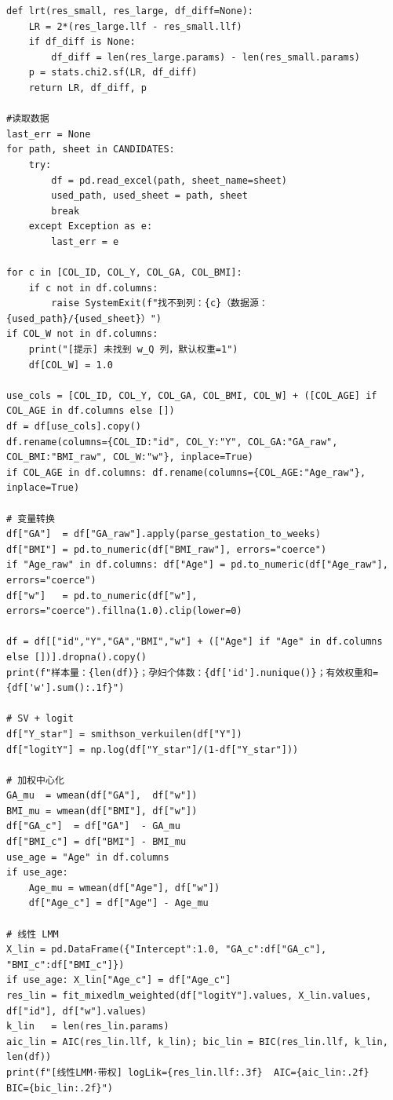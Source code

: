 \begin{lstlisting}
def lrt(res_small, res_large, df_diff=None):
    LR = 2*(res_large.llf - res_small.llf)
    if df_diff is None:
        df_diff = len(res_large.params) - len(res_small.params)
    p = stats.chi2.sf(LR, df_diff)
    return LR, df_diff, p

#读取数据
last_err = None
for path, sheet in CANDIDATES:
    try:
        df = pd.read_excel(path, sheet_name=sheet)
        used_path, used_sheet = path, sheet
        break
    except Exception as e:
        last_err = e

for c in [COL_ID, COL_Y, COL_GA, COL_BMI]:
    if c not in df.columns:
        raise SystemExit(f"找不到列：{c}（数据源：{used_path}/{used_sheet}）")
if COL_W not in df.columns:
    print("[提示] 未找到 w_Q 列，默认权重=1")
    df[COL_W] = 1.0

use_cols = [COL_ID, COL_Y, COL_GA, COL_BMI, COL_W] + ([COL_AGE] if COL_AGE in df.columns else [])
df = df[use_cols].copy()
df.rename(columns={COL_ID:"id", COL_Y:"Y", COL_GA:"GA_raw", COL_BMI:"BMI_raw", COL_W:"w"}, inplace=True)
if COL_AGE in df.columns: df.rename(columns={COL_AGE:"Age_raw"}, inplace=True)

# 变量转换
df["GA"]  = df["GA_raw"].apply(parse_gestation_to_weeks)
df["BMI"] = pd.to_numeric(df["BMI_raw"], errors="coerce")
if "Age_raw" in df.columns: df["Age"] = pd.to_numeric(df["Age_raw"], errors="coerce")
df["w"]   = pd.to_numeric(df["w"], errors="coerce").fillna(1.0).clip(lower=0)

df = df[["id","Y","GA","BMI","w"] + (["Age"] if "Age" in df.columns else [])].dropna().copy()
print(f"样本量：{len(df)}；孕妇个体数：{df['id'].nunique()}；有效权重和={df['w'].sum():.1f}")

# SV + logit
df["Y_star"] = smithson_verkuilen(df["Y"])
df["logitY"] = np.log(df["Y_star"]/(1-df["Y_star"]))

# 加权中心化
GA_mu  = wmean(df["GA"],  df["w"])
BMI_mu = wmean(df["BMI"], df["w"])
df["GA_c"]  = df["GA"]  - GA_mu
df["BMI_c"] = df["BMI"] - BMI_mu
use_age = "Age" in df.columns
if use_age:
    Age_mu = wmean(df["Age"], df["w"])
    df["Age_c"] = df["Age"] - Age_mu

# 线性 LMM
X_lin = pd.DataFrame({"Intercept":1.0, "GA_c":df["GA_c"], "BMI_c":df["BMI_c"]})
if use_age: X_lin["Age_c"] = df["Age_c"]
res_lin = fit_mixedlm_weighted(df["logitY"].values, X_lin.values, df["id"], df["w"].values)
k_lin   = len(res_lin.params)
aic_lin = AIC(res_lin.llf, k_lin); bic_lin = BIC(res_lin.llf, k_lin, len(df))
print(f"[线性LMM·带权] logLik={res_lin.llf:.3f}  AIC={aic_lin:.2f}  BIC={bic_lin:.2f}")


\end{lstlisting}
